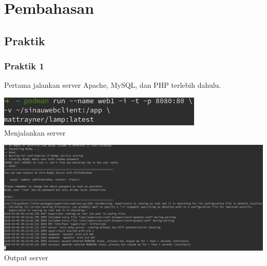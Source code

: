 \documentclass[a4paper,12pt]{article}
\begin{document}
\section{Pembahasan}
\subsection{Praktik}
\subsubsection{Praktik 1}
Pertama jalankan server Apache, MySQL, dan PHP terlebih dahulu.\\
\begin{minipage}{\linewidth}
    \centering
    \includegraphics[scale=1]{1.png}\\
    \caption{Menjalankan server}
\end{minipage}
\begin{minipage}{\linewidth}
    \centering
    \includegraphics[scale=.3]{2.png}\\
    \caption{Output server}
\end{minipage}\\[2ex]
\end{document}
